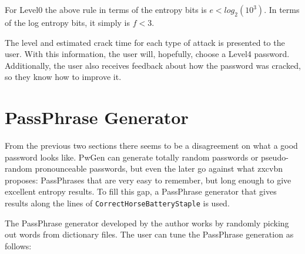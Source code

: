 For Level0 the above rule in terms of the entropy bits is $e<log_{2}(10^{3})$.
In terms of the log entropy bits, it simply is $f<3$.

The level and estimated crack time for each type of attack is presented to the user. With this information, the user will, hopefully, choose a Level4 password. Additionally, the user also receives  feedback about how the password was cracked, so they know how to improve it.

\section{PassPhrase Generator}

From the previous two sections there seems to be a disagreement on what a good password looks like. PwGen can generate totally random passwords or pseudo-random pronounceable passwords, but even the later go against what zxcvbn proposes: PassPhrases that are very easy to remember, but long enough to give excellent entropy results. To fill this gap, a PassPhrase generator that gives results along the lines of \texttt{CorrectHorseBatteryStaple} is used.

The PassPhrase generator developed by the author works by randomly picking out words from dictionary files. The user can tune the PassPhrase generation as follows:

